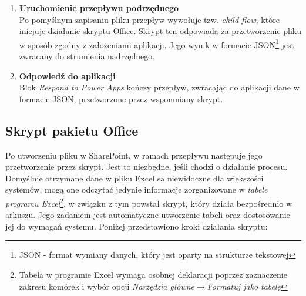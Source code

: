 \begin{enumerate}
    \item \textbf{Uruchomienie przepływu podrzędnego} \\
          Po pomyślnym zapisaniu pliku przepływ wywołuje tzw. \emph{child flow}, które inicjuje działanie skryptu Office. Skrypt ten odpowiada za przetworzenie pliku w sposób zgodny z założeniami aplikacji. Jego wynik w formacie JSON\footnote{JSON - format wymiany danych, który jest oparty na strukturze tekstowej} jest zwracany do strumienia nadrzędnego.

    \item \textbf{Odpowiedź do aplikacji} \\
          Blok \emph{Respond to Power Apps} kończy przepływ, zwracając do aplikacji dane w formacie JSON, przetworzone przez wspomniany skrypt.
\end{enumerate}

\subsection{Skrypt pakietu Office}
Po utworzeniu pliku w SharePoint, w ramach przepływu następuje jego przetworzenie przez skrypt. Jest to niezbędne, jeśli chodzi o działanie procesu. Domyślnie otrzymane dane w pliku Excel są niewidoczne dla większości systemów, mogą one odczytać jedynie informacje zorganizowane w \emph{tabele programu Excel}\footnote{Tabela w programie Excel wymaga osobnej deklaracji poprzez zaznaczenie zakresu komórek i wybór opcji \emph{Narzędzia główne}$\to$\emph{Formatuj jako tabelę}}, w związku z tym powstał skrypt, który działa bezpośrednio w arkuszu. Jego zadaniem jest automatyczne utworzenie tabeli oraz dostosowanie jej do wymagań systemu. Poniżej przedstawiono kroki działania skryptu:

